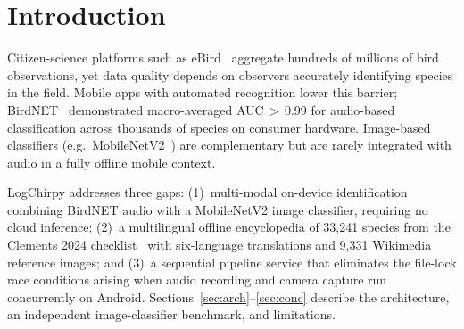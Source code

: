 \section{Introduction}

Citizen-science platforms such as eBird~\cite{Sullivan2009} aggregate hundreds of
millions of bird observations, yet data quality depends on observers accurately
identifying species in the field.
Mobile apps with automated recognition lower this barrier; BirdNET~\cite{BirdNET2021}
demonstrated macro-averaged AUC\,$>$\,0.99 for audio-based classification across
thousands of species on consumer hardware.
Image-based classifiers (e.g.\ MobileNetV2~\cite{Sandler2018}) are complementary
but are rarely integrated with audio in a fully offline mobile context.

LogChirpy addresses three gaps: (1)~multi-modal on-device identification combining
BirdNET audio with a MobileNetV2 image classifier, requiring no cloud inference;
(2)~a multilingual offline encyclopedia of 33,241 species from the Clements 2024
checklist~\cite{Clements2024} with six-language translations and 9,331 Wikimedia
reference images; and (3)~a sequential pipeline service that eliminates the
file-lock race conditions arising when audio recording and camera capture run
concurrently on Android.
Sections~\ref{sec:arch}--\ref{sec:conc} describe the architecture,
an independent image-classifier benchmark, and limitations.
